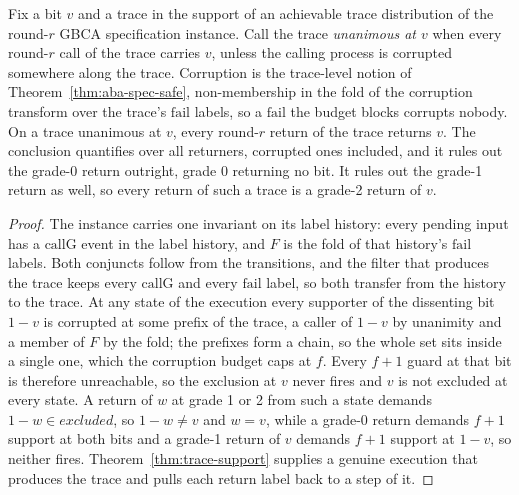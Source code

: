 \begin{theorem}
  \label{thm:gbca-spec-validity}
  \leanok
  Fix a bit $v$ and a trace in the support of an achievable trace distribution of the round-$r$ GBCA specification instance.
  Call the trace \emph{unanimous at $v$} when every round-$r$ call of the trace carries $v$, unless the calling process is corrupted somewhere along the trace.\leanok{} Corruption is the trace-level notion of Theorem~\ref{thm:aba-spec-safe}, non-membership in the fold of the corruption transform over the trace's $\mathrm{fail}$ labels, so a $\mathrm{fail}$ the budget blocks corrupts nobody.\leanok{} On a trace unanimous at $v$, every round-$r$ return of the trace returns $v$.\leanok{} The conclusion quantifies over all returners, corrupted ones included, and it rules out the grade-0 return outright, grade $0$ returning no bit.\leanok{} It rules out the grade-1 return as well, so every return of such a trace is a grade-2 return of $v$.\leanok{}
\end{theorem}

\begin{proof}\leanok
  The instance carries one invariant on its label history: every pending input has a $\mathrm{callG}$ event in the label history, and $F$ is the fold of that history's $\mathrm{fail}$ labels.\leanok{} Both conjuncts follow from the transitions, and the filter that produces the trace keeps every $\mathrm{callG}$ and every $\mathrm{fail}$ label, so both transfer from the history to the trace.
  At any state of the execution every supporter of the dissenting bit $1-v$ is corrupted at some prefix of the trace, a caller of $1-v$ by unanimity and a member of $F$ by the fold; the prefixes form a chain, so the whole set sits inside a single one, which the corruption budget caps at $f$.\leanok{} Every $f{+}1$ guard at that bit is therefore unreachable, so the exclusion at $v$ never fires and $v$ is not excluded at every state.\leanok{} A return of $w$ at grade 1 or 2 from such a state demands $1-w \in excluded$, so $1-w \neq v$ and $w = v$, while a grade-0 return demands $f{+}1$ support at both bits and a grade-1 return of $v$ demands $f{+}1$ support at $1-v$, so neither fires.\leanok{} Theorem~\ref{thm:trace-support} supplies a genuine execution that produces the trace and pulls each return label back to a step of it.
\end{proof}
